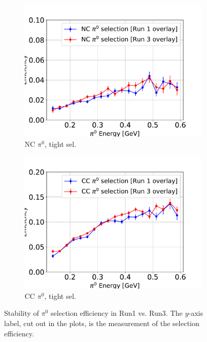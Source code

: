 \documentclass[a4paper]{article}
\begin{document}
\begin{figure}[H]
\begin{center}
\begin{subfigure}[b]{0.4\textwidth}
    \centering
    \includegraphics[width=1.00\textwidth]{stability/pi0_e_03112020_eff_NC_tight.pdf}
    \caption{\label{fig:stability:pi0eff:NCtight} NC $\pi^0$, tight sel.}
    \end{subfigure}
    \begin{subfigure}[b]{0.4\textwidth}
    \centering
    \includegraphics[width=1.00\textwidth]{stability/pi0_e_03112020_eff_CC_tight.pdf}
    \caption{\label{fig:stability:pi0eff:CCtight} CC $\pi^0$, tight sel.}
    \end{subfigure}
\caption{\label{fig:stability:pi0eff}Stability of $\pi^0$ selection efficiency in Run1 vs. Run3. The $y$-axis label, cut out in the plots, is the measurement of the selection efficiency.}
\end{center}
\end{figure}
\end{document}
